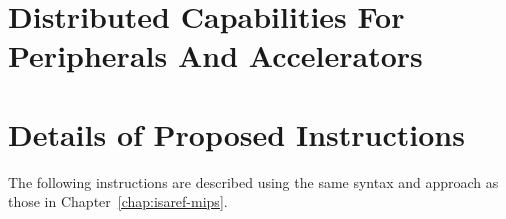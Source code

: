 \section{Distributed Capabilities For Peripherals And Accelerators} %


\section{Details of Proposed Instructions} %
\label{app:exp:insns}

The following instructions are described using the same syntax and approach as
those in Chapter~\ref{chap:isaref-mips}.













